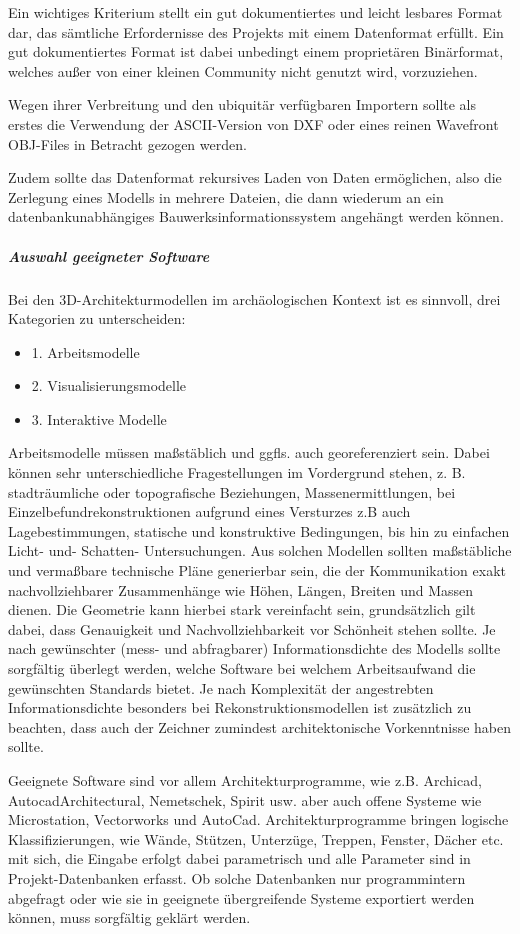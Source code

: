 Ein wichtiges Kriterium stellt ein gut dokumentiertes und leicht lesbares Format dar, das sämtliche Erfordernisse des Projekts mit einem Datenformat erfüllt. Ein gut dokumentiertes Format ist dabei unbedingt einem proprietären Binärformat, welches außer von einer kleinen Community nicht genutzt wird, vorzuziehen.

Wegen ihrer Verbreitung und den ubiquitär verfügbaren Importern sollte als erstes die Verwendung der ASCII-Version von DXF oder eines reinen Wavefront OBJ-Files in Betracht gezogen werden.

Zudem sollte das Datenformat rekursives Laden von Daten ermöglichen, also die Zerlegung eines Modells in mehrere Dateien, die dann wiederum an ein datenbankunabhängiges Bauwerksinformationssystem angehängt werden können.


\subparagraph{Auswahl geeigneter Software}Bei den 3D-Architekturmodellen im archäologischen Kontext ist es sinnvoll, drei Kategorien zu unterscheiden:

\begin{itemize}
	\item 1. Arbeitsmodelle
	\item 2. Visualisierungsmodelle
	\item 3. Interaktive Modelle
\end{itemize}


Arbeitsmodelle müssen maßstäblich und ggfls. auch georeferenziert sein. Dabei können sehr unterschiedliche Fragestellungen im Vordergrund stehen, z. B. stadträumliche oder topografische Beziehungen, Massenermittlungen, bei Einzelbefundrekonstruktionen aufgrund eines Versturzes z.B auch Lagebestimmungen, statische und konstruktive Bedingungen, bis hin zu einfachen Licht- und- Schatten- Untersuchungen. Aus solchen Modellen sollten maßstäbliche und vermaßbare technische Pläne generierbar sein, die der Kommunikation exakt nachvollziehbarer Zusammenhänge wie Höhen, Längen, Breiten und Massen dienen. Die Geometrie kann hierbei stark vereinfacht sein, grundsätzlich gilt dabei, dass Genauigkeit und Nachvollziehbarkeit vor Schönheit stehen sollte. Je nach gewünschter (mess- und abfragbarer) Informationsdichte des Modells sollte sorgfältig überlegt werden, welche Software bei welchem Arbeitsaufwand die gewünschten Standards bietet. Je nach Komplexität der angestrebten Informationsdichte besonders bei Rekonstruktionsmodellen ist zusätzlich zu beachten, dass auch der Zeichner zumindest architektonische Vorkenntnisse haben sollte.

Geeignete Software sind vor allem Architekturprogramme, wie z.B. Archicad, AutocadArchitectural, Nemetschek, Spirit usw. aber auch offene Systeme wie Microstation, Vectorworks und AutoCad. Architekturprogramme bringen logische Klassifizierungen, wie Wände, Stützen, Unterzüge, Treppen, Fenster, Dächer etc. mit sich, die Eingabe erfolgt dabei parametrisch und alle Parameter sind in Projekt-Datenbanken erfasst. Ob solche Datenbanken nur programmintern abgefragt oder wie sie in geeignete übergreifende Systeme exportiert werden können, muss sorgfältig geklärt werden.  

